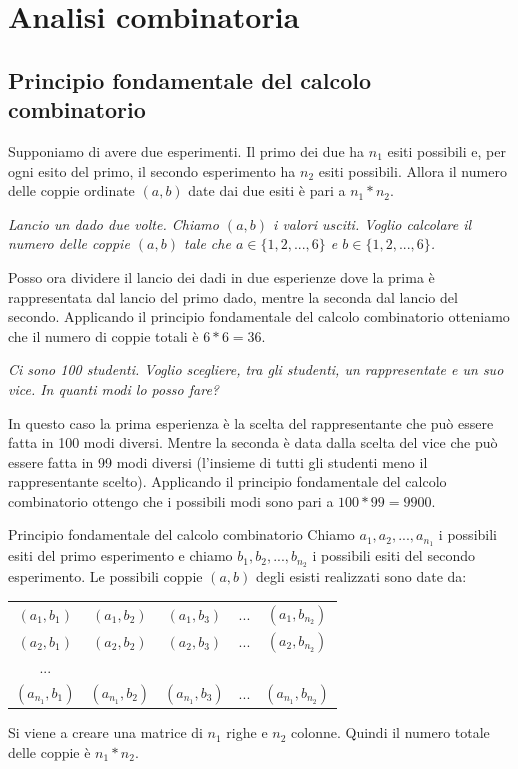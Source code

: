 \chapter{Analisi combinatoria}

\section{Principio fondamentale del calcolo combinatorio}
Supponiamo di avere due esperimenti. Il primo dei due ha $n_1$ esiti possibili e, per ogni esito del primo, il secondo esperimento ha $n_2$ esiti possibili. Allora il numero delle coppie ordinate $(a,b)$ date dai due esiti è pari a $n_1*n_2$.

\begin{Example}{}{}
    \textit{Lancio un dado due volte. Chiamo $(a,b)$ i valori usciti. Voglio calcolare il numero delle coppie $(a,b)$ tale che $a\in\{1,2,...,6\}$ e $b\in\{1,2,...,6\}$.}

    Posso ora dividere il lancio dei dadi in due esperienze dove la prima è rappresentata dal lancio del primo dado, mentre la seconda dal lancio del secondo. Applicando il principio fondamentale del calcolo combinatorio otteniamo che il numero di coppie totali è $6*6=36$.
\end{Example}

\begin{Example}{}{}
    \textit{Ci sono 100 studenti. Voglio scegliere, tra gli studenti, un rappresentate e un suo vice. In quanti modi lo posso fare?}

    In questo caso la prima esperienza è la scelta del rappresentante che può essere fatta in 100 modi diversi. Mentre la seconda è data dalla scelta del vice che può essere fatta in 99 modi diversi (l'insieme di tutti gli studenti meno il rappresentante scelto). Applicando il principio fondamentale del calcolo combinatorio ottengo che i possibili modi sono pari a $100*99=9900$.
\end{Example}


\begin{Demonstration}{Principio fondamentale del calcolo combinatorio}{}
    Chiamo $a_1,a_2,...,a_{n_1}$ i possibili esiti del primo esperimento e chiamo $b_1,b_2,...,b_{n_2}$ i possibili esiti del secondo esperimento. Le possibili coppie $(a,b)$ degli esisti realizzati sono date da:
    \begin{tabular}{c c c c c}
         $(a_1,b_1)$&$(a_1,b_2)$&$(a_1,b_3)$&...&$(a_1,b_{n_2})$\\
         $(a_2,b_1)$&$(a_2,b_2)$&$(a_2,b_3)$&...&$(a_2,b_{n_2})$\\
         ...&&&&\\
         $(a_{n_1},b_1)$&$(a_{n_1},b_2)$&$(a_{n_1},b_3)$&...&$(a_{n_1},b_{n_2})$\\
    \end{tabular}
    
    Si viene a creare una matrice di $n_1$ righe e $n_2$ colonne. Quindi il numero totale delle coppie è $n_1*n_2$.
\end{Demonstration}


